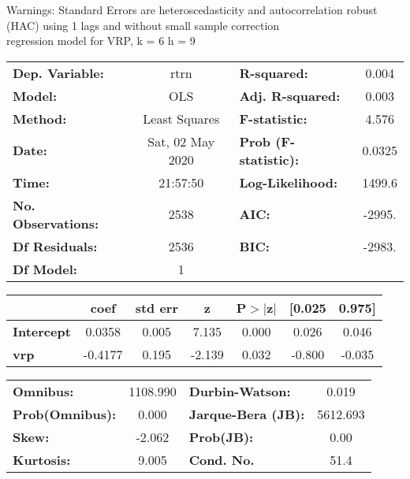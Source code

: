 Warnings: \newline
 [1] Standard Errors are heteroscedasticity and autocorrelation robust (HAC) using 1 lags and without small sample correction\\ 

regression model for VRP, k = 6 h = 9\begin{center}
\begin{tabular}{lclc}
\toprule
\textbf{Dep. Variable:}    &       rtrn       & \textbf{  R-squared:         } &     0.004   \\
\textbf{Model:}            &       OLS        & \textbf{  Adj. R-squared:    } &     0.003   \\
\textbf{Method:}           &  Least Squares   & \textbf{  F-statistic:       } &     4.576   \\
\textbf{Date:}             & Sat, 02 May 2020 & \textbf{  Prob (F-statistic):} &   0.0325    \\
\textbf{Time:}             &     21:57:50     & \textbf{  Log-Likelihood:    } &    1499.6   \\
\textbf{No. Observations:} &        2538      & \textbf{  AIC:               } &    -2995.   \\
\textbf{Df Residuals:}     &        2536      & \textbf{  BIC:               } &    -2983.   \\
\textbf{Df Model:}         &           1      & \textbf{                     } &             \\
\bottomrule
\end{tabular}
\begin{tabular}{lcccccc}
                   & \textbf{coef} & \textbf{std err} & \textbf{z} & \textbf{P$> |$z$|$} & \textbf{[0.025} & \textbf{0.975]}  \\
\midrule
\textbf{Intercept} &       0.0358  &        0.005     &     7.135  &         0.000        &        0.026    &        0.046     \\
\textbf{vrp}       &      -0.4177  &        0.195     &    -2.139  &         0.032        &       -0.800    &       -0.035     \\
\bottomrule
\end{tabular}
\begin{tabular}{lclc}
\textbf{Omnibus:}       & 1108.990 & \textbf{  Durbin-Watson:     } &    0.019  \\
\textbf{Prob(Omnibus):} &   0.000  & \textbf{  Jarque-Bera (JB):  } & 5612.693  \\
\textbf{Skew:}          &  -2.062  & \textbf{  Prob(JB):          } &     0.00  \\
\textbf{Kurtosis:}      &   9.005  & \textbf{  Cond. No.          } &     51.4  \\
\bottomrule
\end{tabular}
\end{center}


